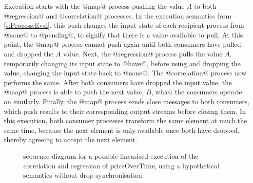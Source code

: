 Execution starts with the @map@ process pushing the value $A$ to both @regression@ and @correlation@ processes.
In the execution semantics from \cref{s:Process:Eval}, this push changes the input state of each recipient process from @none@ to @pending@, to signify that there is a value available to pull.
At this point, the @map@ process cannot push again until both consumers have pulled and dropped the $A$ value.
Next, the @regression@ process pulls the value $A$, temporarily changing its input state to @have@, before using and dropping the value, changing the input state back to @none@.
The @correlation@ process now performs the same.
After both consumers have dropped the input value, the @map@ process is able to push the next value, $B$, which the consumers operate on similarly.
Finally, the @map@ process sends close messages to both consumers, which push results to their corresponding output streams before closing them.
In this execution, both consumer processes transform the same element at much the same time, because the next element is only available once both have dropped, thereby agreeing to accept the next element.


\begin{figure}
\center
\begin{sequencediagram}









\end{sequencediagram}
\caption{sequence diagram for a possible linearised execution of the correlation and regression of priceOverTime, using a hypothetical semantics without drop synchronisation. }
\label{figs/swim/drop/priceOverTime-nosync}
\end{figure}



